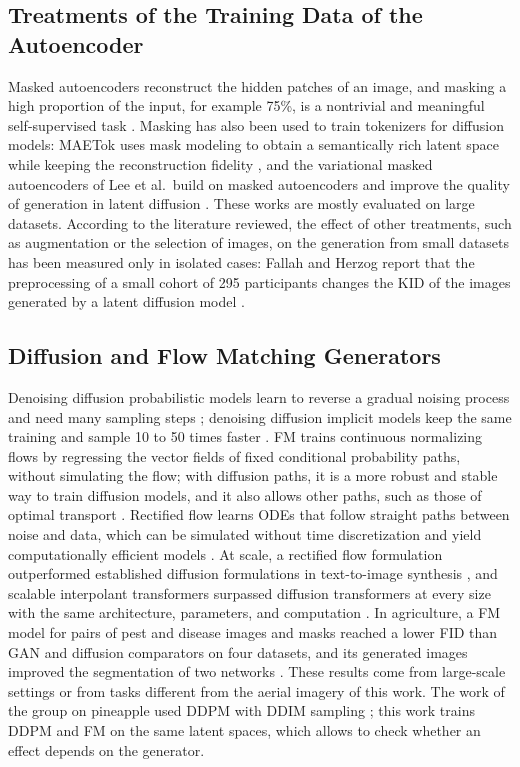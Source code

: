\subsection{Treatments of the Training Data of the Autoencoder}

Masked autoencoders reconstruct the hidden patches of an image, and masking a high proportion of the input, for example 75\%, is a nontrivial and meaningful self-supervised task \cite{He2022}. Masking has also been used to train tokenizers for diffusion models: MAETok uses mask modeling to obtain a semantically rich latent space while keeping the reconstruction fidelity \cite{Chen2025}, and the variational masked autoencoders of Lee et al.\ build on masked autoencoders and improve the quality of generation in latent diffusion \cite{Lee2025LDMAE}. These works are mostly evaluated on large datasets. According to the literature reviewed, the effect of other treatments, such as augmentation or the selection of images, on the generation from small datasets has been measured only in isolated cases: Fallah and Herzog report that the preprocessing of a small cohort of 295 participants changes the KID of the images generated by a latent diffusion model \cite{Fallah2026}.

\subsection{Diffusion and Flow Matching Generators}

Denoising diffusion probabilistic models learn to reverse a gradual noising process and need many sampling steps \cite{Ho2020}; denoising diffusion implicit models keep the same training and sample 10 to 50 times faster \cite{Song2021}. FM trains continuous normalizing flows by regressing the vector fields of fixed conditional probability paths, without simulating the flow; with diffusion paths, it is a more robust and stable way to train diffusion models, and it also allows other paths, such as those of optimal transport \cite{Lipman2023}. Rectified flow learns ODEs that follow straight paths between noise and data, which can be simulated without time discretization and yield computationally efficient models \cite{Liu2023}. At scale, a rectified flow formulation outperformed established diffusion formulations in text-to-image synthesis \cite{Esser2024}, and scalable interpolant transformers surpassed diffusion transformers at every size with the same architecture, parameters, and computation \cite{Ma2024}. In agriculture, a FM model for pairs of pest and disease images and masks reached a lower FID than GAN and diffusion comparators on four datasets, and its generated images improved the segmentation of two networks \cite{Kong2026}. These results come from large-scale settings or from tasks different from the aerial imagery of this work. The work of the group on pineapple used DDPM with DDIM sampling \cite{Gonzalez2026}; this work trains DDPM and FM on the same latent spaces, which allows to check whether an effect depends on the generator.


